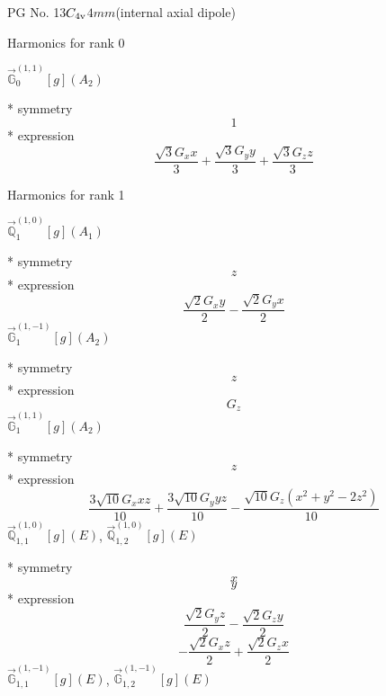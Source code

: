 \documentclass[fleqn,8pt]{jsarticle}
\begin{document}
\setcounter{MaxMatrixCols}{32}

\renewcommand{\tablename}{Table~}
\renewcommand{\figurename}{Figure~}
\begin{center}
\LARGE
PG No. 13\quad$C_{\rm 4v}$\quad$4mm$\quad[ tetragonal ] (internal axial dipole)
\end{center}

\noindent * Harmonics for rank 0

\noindent\quad $\vec{\mathbb{G}}_{0}^{(1,1)}[g](A_{2})$

\noindent\quad ** symmetry
\begin{dmath*}
1
\end{dmath*}
\noindent\quad ** expression
\begin{dmath*}
\frac{\sqrt{3} G_{x} x}{3} + \frac{\sqrt{3} G_{y} y}{3} + \frac{\sqrt{3} G_{z} z}{3}
\end{dmath*}

\noindent * Harmonics for rank 1

\noindent\quad $\vec{\mathbb{Q}}_{1}^{(1,0)}[g](A_{1})$

\noindent\quad ** symmetry
\begin{dmath*}
z
\end{dmath*}
\noindent\quad ** expression
\begin{dmath*}
\frac{\sqrt{2} G_{x} y}{2} - \frac{\sqrt{2} G_{y} x}{2}
\end{dmath*}
\noindent\quad $\vec{\mathbb{G}}_{1}^{(1,-1)}[g](A_{2})$

\noindent\quad ** symmetry
\begin{dmath*}
z
\end{dmath*}
\noindent\quad ** expression
\begin{dmath*}
G_{z}
\end{dmath*}
\noindent\quad $\vec{\mathbb{G}}_{1}^{(1,1)}[g](A_{2})$

\noindent\quad ** symmetry
\begin{dmath*}
z
\end{dmath*}
\noindent\quad ** expression
\begin{dmath*}
\frac{3 \sqrt{10} G_{x} x z}{10} + \frac{3 \sqrt{10} G_{y} y z}{10} - \frac{\sqrt{10} G_{z} \left(x^{2} + y^{2} - 2 z^{2}\right)}{10}
\end{dmath*}
\noindent\quad $\vec{\mathbb{Q}}_{1,1}^{(1,0)}[g](E)$, $\vec{\mathbb{Q}}_{1,2}^{(1,0)}[g](E)$

\noindent\quad ** symmetry
\begin{dmath*}
x
\end{dmath*}
\begin{dmath*}
y
\end{dmath*}
\noindent\quad ** expression
\begin{dmath*}
\frac{\sqrt{2} G_{y} z}{2} - \frac{\sqrt{2} G_{z} y}{2}
\end{dmath*}
\begin{dmath*}
- \frac{\sqrt{2} G_{x} z}{2} + \frac{\sqrt{2} G_{z} x}{2}
\end{dmath*}
\noindent\quad $\vec{\mathbb{G}}_{1,1}^{(1,-1)}[g](E)$, $\vec{\mathbb{G}}_{1,2}^{(1,-1)}[g](E)$
\end{document}
